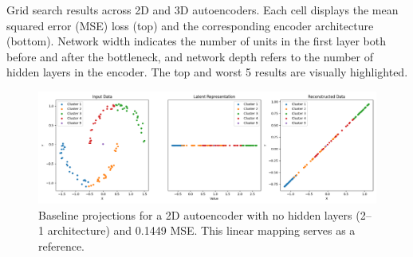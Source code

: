 \begin{table}[htb]
\caption{Grid search results across 2D and 3D autoencoders. Each cell displays the mean squared error (MSE) loss (top) and the corresponding encoder architecture (bottom). Network width indicates the number of units in the first layer both before and after the bottleneck, and network depth refers to the number of hidden layers in the encoder. The top and worst 5 results are visually highlighted.}
\label{tab:rq1-combined}
\end{table}

\begin{figure}[htb]
    \centering
    \includegraphics[width=\linewidth]{images/RQ1/2-1_0.1449.png}
    \caption{Baseline projections for a 2D autoencoder with no hidden layers (2–1 architecture) and \textcolor{red!60!black}{0.1449} MSE. This linear mapping serves as a reference.}
    \label{fig:2-1}
\end{figure}

